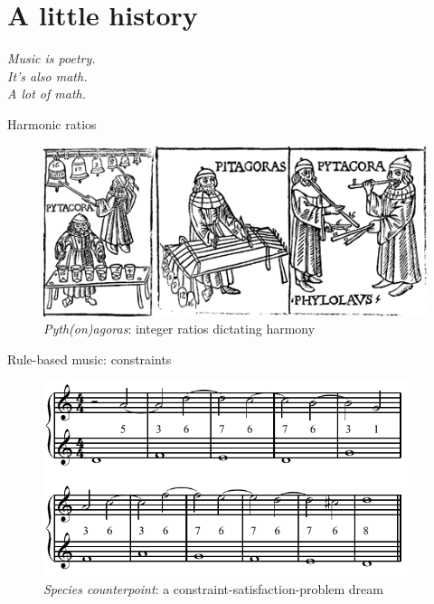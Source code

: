 \section{A little history}

\begin{frame}{}
\vfill
\begin{centering}
\textit{Music is poetry.\\ It's also math.\\ A lot of math.\\}
\end{centering}
\vfill
\end{frame}

\begin{frame}{Harmonic ratios}
    \begin{figure}
    \begin{centering}
    \includegraphics[max width=\textwidth]{assets/include-pythagoras.png}
    \caption{\emph{Pyth(on)agoras}: integer ratios dictating harmony}
    \end{centering}
    \end{figure}
\end{frame}

\begin{frame}{Rule-based music: constraints}
    \begin{figure}
    \begin{centering}
    \includegraphics[height=2.25in]{assets/include-species-counterpoint.png}
    \caption{\emph{Species counterpoint}: a constraint-satisfaction-problem dream}
    \end{centering}
    \end{figure}
\end{frame}


